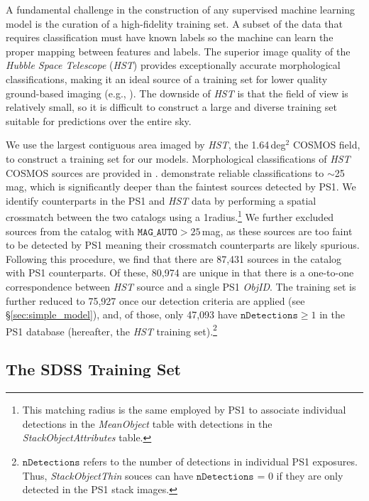 \documentclass[twocolumn]{aastex62}
\begin{document}
A fundamental challenge in the construction of any supervised machine learning
model is the curation of a high-fidelity training set. A subset of the data
that requires classification must have known labels so the machine can learn
the proper mapping between features and labels. The superior image quality of
the \textit{Hubble Space Telescope} (\textit{HST}) provides exceptionally
accurate morphological classifications, making it an ideal source of a training
set for lower quality ground-based imaging (e.g., \citealt{Lupton01}). The
downside of \textit{HST} is that the field of view is relatively small, so it
is difficult to construct a large and diverse training set suitable for
predictions over the entire sky.

We use the largest contiguous area imaged by \textit{HST}, the 1.64\,deg$^2$
COSMOS field, to construct a training set for our models. Morphological
classifications of \textit{HST} COSMOS sources are provided in
\citet{Leauthaud07}. \citeauthor{Leauthaud07} demonstrate reliable
classifications to $\sim$25\,mag, which is significantly deeper than the
faintest sources detected by PS1. We identify counterparts in the PS1 and
\textit{HST} data by performing a spatial crossmatch between the two catalogs
using a 1\arcsec radius.\footnote{This matching radius is the same employed
by PS1 to associate individual detections in the \textit{MeanObject} table
with detections in the \textit{StackObjectAttributes} table.} We further
excluded sources from the \citet{Leauthaud07} catalog with
$\texttt{MAG\_AUTO} > 25$\,mag, as these sources are too faint to be detected
by PS1 meaning their crossmatch counterparts are likely spurious. Following
this procedure, we find that there are 87,431 sources in the
\citet{Leauthaud07} catalog with PS1 counterparts. Of these, 80,974 are
unique in that there is a one-to-one correspondence between \textit{HST}
source and a single PS1 \textit{ObjID}. The training set is further reduced
to 75,927 once our detection criteria are applied (see
\S\ref{sec:simple_model}), and, of those, only 47,093 have
$\texttt{nDetections} \ge 1$ in the PS1 database (hereafter, the \textit{HST}
training set).\footnote{$\texttt{nDetections}$ refers to the number of
detections in individual PS1 exposures. Thus, \textit{StackObjectThin} souces
can have $\texttt{nDetections}$ = 0 if they are only detected in the PS1
stack images.}

\subsection{The SDSS Training Set}\label{sec:sdss}
\end{document}
